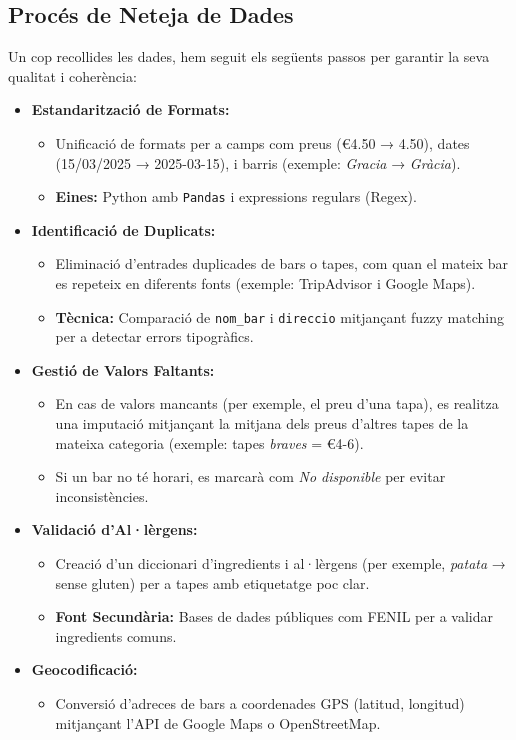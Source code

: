 \documentclass[12pt,a4paper]{article}
\begin{document}
\subsection{Procés de Neteja de Dades}

Un cop recollides les dades, hem seguit els següents passos per garantir la seva qualitat i coherència:

\begin{itemize}
    \item \textbf{Estandarització de Formats:}
    \begin{itemize}
        \item Unificació de formats per a camps com preus (€4.50 → 4.50), dates (15/03/2025 → 2025-03-15), i barris (exemple: \textit{Gracia} → \textit{Gràcia}).
        \item \textbf{Eines:} Python amb \texttt{Pandas} i expressions regulars (Regex).
    \end{itemize}

    \item \textbf{Identificació de Duplicats:}
    \begin{itemize}
        \item Eliminació d'entrades duplicades de bars o tapes, com quan el mateix bar es repeteix en diferents fonts (exemple: TripAdvisor i Google Maps).
        \item \textbf{Tècnica:} Comparació de \texttt{nom\_bar} i \texttt{direccio} mitjançant fuzzy matching per a detectar errors tipogràfics.
    \end{itemize}

    \item \textbf{Gestió de Valors Faltants:}
    \begin{itemize}
        \item En cas de valors mancants (per exemple, el preu d'una tapa), es realitza una imputació mitjançant la mitjana dels preus d'altres tapes de la mateixa categoria (exemple: tapes \textit{braves} = €4-6).
        \item Si un bar no té horari, es marcarà com \textit{No disponible} per evitar inconsistències.
    \end{itemize}

    \item \textbf{Validació d’Al·lèrgens:}
    \begin{itemize}
        \item Creació d'un diccionari d’ingredients i al·lèrgens (per exemple, \textit{patata} → sense gluten) per a tapes amb etiquetatge poc clar.
        \item \textbf{Font Secundària:} Bases de dades públiques com FENIL per a validar ingredients comuns.
    \end{itemize}

    \item \textbf{Geocodificació:}
    \begin{itemize}
        \item Conversió d’adreces de bars a coordenades GPS (latitud, longitud) mitjançant l’API de Google Maps o OpenStreetMap.
    \end{itemize}
\end{itemize}
\end{document}
